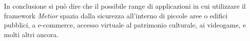 In conclusione si può dire che il possibile range di applicazioni in cui utilizzare il framework \emph{Metior}
spazia dalla sicurezza all'interno di piccole aree o edifici pubblici, a e-commerce, accesso virtuale al patrimonio culturale,
 ai videogame, e molti altri ancora.
